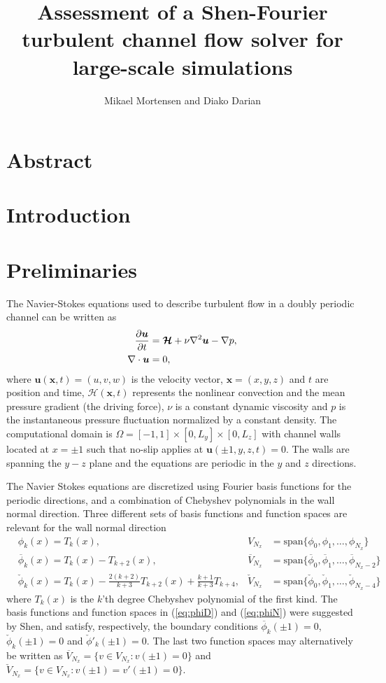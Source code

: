 \documentclass[11pt, oneside]{article}
\title{Assessment of a Shen-Fourier turbulent channel flow solver for large-scale simulations}
\author{Mikael Mortensen and Diako Darian}
\newcommand{\N}[1]{\check{#1}}
\newcommand{\D}[1]{\overline{#1}}
\begin{document}
\maketitle
\section*{Abstract}

\section{Introduction}

\section{Preliminaries}
The Navier-Stokes equations used to describe turbulent flow in a doubly 
periodic channel can be written as
\begin{align}
 \frac{\partial \bm{u}}{\partial t}   &= \bm{\mathcal{H}} + \nu 
 \nabla^2 \bm{u} - \nabla{p}, \notag \\
 \nabla \cdot \bm{u} &= 0, \label{eq:NS}
\end{align}
where $\bm{u}(\bm{x}, t)=(u, v, w)$ is the velocity vector, $\bm{x}=(x, y, z)$ 
and $t$ are position and time, $\bm{\mathcal{H}}(\bm{x}, t)$ represents the 
nonlinear convection and the mean pressure gradient (the driving force), $\nu$ 
is a constant dynamic viscosity and $p$ is the instantaneous pressure 
fluctuation normalized by a constant density. The 
computational domain is $\Omega=[-1, 1]\times [0, L_y] \times [0, L_z]$ with 
channel walls located at $x=\pm 1$ such that no-slip applies at $ \bm{u}(\pm 1, 
y, z, t) = 0$. The walls are spanning the $y-z$ plane and the equations are 
periodic in the $y$ and $z$ directions. 

The Navier Stokes equations are discretized using Fourier basis functions for the periodic directions, and a combination of Chebyshev polynomials in the wall normal direction. Three different sets of basis functions and function spaces are relevant for the wall normal direction
\begin{align}
&  \phi_k(x) = T_k(x), & V_{N_x} &= \text{span}\{\phi_0, \phi_1,\ldots, \phi_{N_x}\} \label{eq:Tk}\\
& \D{\phi}_k(x) = T_k(x) - T_{k+2}(x), & \D{V}_{N_x} &= \text{span} \{ \D{\phi}_0, \D{\phi}_1, \ldots, \D{\phi}_{N_x-2} \} \label{eq:phiD}\\
& \N{\phi}_k(x) = T_k(x) - \frac{2(k+2)}{k+3} T_{k+2}(x) + 
\frac{k+1}{k+3} T_{k+4}, & \N{V}_{N_x} &= \text{span} \{\N{\phi}_0, \N{\phi}_1, 
\ldots, \N{\phi}_{N_x-4} \} \label{eq:phiN} 
\end{align}
where $T_k(x)$ is the $k$'th degree Chebyshev polynomial of the first kind. The 
basis functions and function spaces in (\ref{eq:phiD}) and (\ref{eq:phiN}) were 
suggested by Shen, and satisfy, respectively, the boundary conditions 
$\D{\phi}_k(\pm 1) = 0$, $\N{\phi}_k(\pm 1)=0$ and $\N{\phi}'_k(\pm 1)=0$. The 
last two function spaces may alternatively be written as $\D{V}_{N_x} = \{v \in 
V_{N_x}: v(\pm 1)=0 \}$ and $\N{V}_{N_x} = \{v \in V_{N_x}: v(\pm 1) = v'(\pm 
1) = 0 \}$.  
\end{document}
